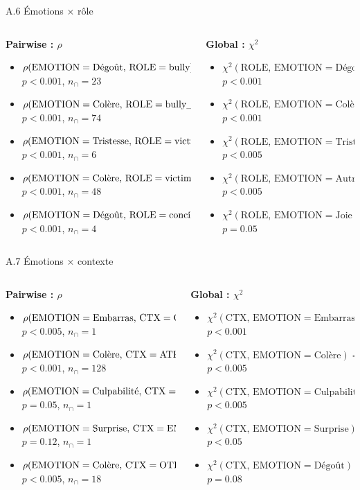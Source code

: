 \documentclass[aspectratio=169,10pt,xcolor=table]{beamer}
\newcommand{\pval}[1]{\ensuremath{#1}}
\newcommand{\pos}[1]{\textcolor{Positive}{#1}}
\newcommand{\negcorr}[1]{\textcolor{Negative}{#1}}
\newcommand{\rhoitem}[7]{\item \(\rho(\mathrm{#1}=\text{#2},\,\mathrm{#3}=\text{#4}) = #5\)\\[-0.15em]{\tiny \(p\pval{#6}\), \(n_{\cap}=#7\)}}
\newcommand{\chiitem}[5]{\item \(\chi^2(\mathrm{#1},\,\mathrm{#2}=\text{#3}) = #4\)\\[-0.15em]{\tiny \(p\pval{#5}\)}}
\begin{document}
\begin{frame}{A.6 Émotions × rôle}
\scriptsize
\begin{columns}[T,onlytextwidth]
\begin{column}{0.49\textwidth}
\textbf{Pairwise : \(\rho\)}
\begin{itemize}
\setlength\itemsep{0.55em}
\rhoitem{EMOTION}{Dégoût}{ROLE}{bully}{\pos{0.14}}{<0.001}{23}
\rhoitem{EMOTION}{Colère}{ROLE}{bully\_support}{\negcorr{-0.14}}{<0.001}{74}
\rhoitem{EMOTION}{Tristesse}{ROLE}{victim}{\pos{0.13}}{<0.001}{6}
\rhoitem{EMOTION}{Colère}{ROLE}{victim}{\pos{0.13}}{<0.001}{48}
\rhoitem{EMOTION}{Dégoût}{ROLE}{conciliator}{\negcorr{-0.13}}{<0.001}{4}
\end{itemize}
\end{column}
\begin{column}{0.49\textwidth}
\textbf{Global : \(\chi^2\)}
\begin{itemize}
\setlength\itemsep{0.55em}
\chiitem{ROLE}{EMOTION}{Dégoût}{34.60}{<0.001}
\chiitem{ROLE}{EMOTION}{Colère}{25.67}{<0.001}
\chiitem{ROLE}{EMOTION}{Tristesse}{17.71}{<0.005}
\chiitem{ROLE}{EMOTION}{Autre}{15.47}{<0.005}
\chiitem{ROLE}{EMOTION}{Joie}{9.70}{=0.05}
\end{itemize}
\end{column}
\end{columns}
\end{frame}

\begin{frame}{A.7 Émotions × contexte}
\scriptsize
\begin{columns}[T,onlytextwidth]
\begin{column}{0.49\textwidth}
\textbf{Pairwise : \(\rho\)}
\begin{itemize}
\setlength\itemsep{0.55em}
\rhoitem{EMOTION}{Embarras}{CTX}{CR}{\pos{0.23}}{<0.005}{1}
\rhoitem{EMOTION}{Colère}{CTX}{ATK}{\pos{0.16}}{<0.001}{128}
\rhoitem{EMOTION}{Culpabilité}{CTX}{CR}{\pos{0.16}}{=0.05}{1}
\rhoitem{EMOTION}{Surprise}{CTX}{EMP}{\pos{0.13}}{=0.12}{1}
\rhoitem{EMOTION}{Colère}{CTX}{OTH}{\negcorr{-0.12}}{<0.005}{18}
\end{itemize}
\end{column}
\begin{column}{0.49\textwidth}
\textbf{Global : \(\chi^2\)}
\begin{itemize}
\setlength\itemsep{0.55em}
\chiitem{CTX}{EMOTION}{Embarras}{35.50}{<0.001}
\chiitem{CTX}{EMOTION}{Colère}{23.36}{<0.005}
\chiitem{CTX}{EMOTION}{Culpabilité}{20.44}{<0.005}
\chiitem{CTX}{EMOTION}{Surprise}{18.15}{<0.05}
\chiitem{CTX}{EMOTION}{Dégoût}{12.67}{=0.08}
\end{itemize}
\end{column}
\end{columns}
\end{frame}
\end{document}
